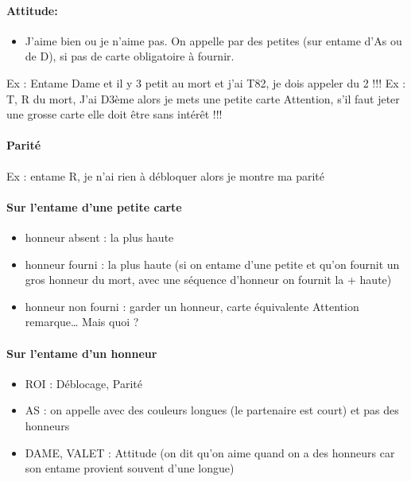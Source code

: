 \documentclass[a4paper]{article}
\begin{document}
\paragraph{Attitude:}

\begin{itemize}
\item J’aime bien ou je n’aime pas. On appelle par des petites (sur entame d’As ou de D), si pas de carte obligatoire à fournir.

\end{itemize}

Ex : Entame Dame et il y 3 petit au mort et j’ai T82, je dois appeler du 2 !!!
Ex : T, R du mort, J’ai D3ème alors je mets une petite carte
Attention, s’il faut jeter une grosse carte elle doit être sans intérêt !!!

\paragraph{Parité}

Ex : entame R, je n’ai rien à débloquer alors je montre ma parité

\paragraph{Sur l’entame d’une petite carte}

\begin{itemize}
\item honneur absent : la plus haute

\item honneur fourni : la plus haute (si on entame d’une petite et qu’on fournit un gros honneur du mort, avec une séquence d’honneur on fournit la + haute)

\item honneur non fourni : garder un honneur, carte équivalente
Attention remarque… Mais quoi ?

\end{itemize}

\paragraph{Sur l’entame d’un honneur}

\begin{itemize}
\item ROI : Déblocage, Parité

\item AS : on appelle avec des couleurs longues (le partenaire est court) et pas des honneurs

\item DAME, VALET : Attitude (on dit qu’on aime quand on a des honneurs car son entame provient souvent d’une longue)

\end{itemize}
\end{document}
